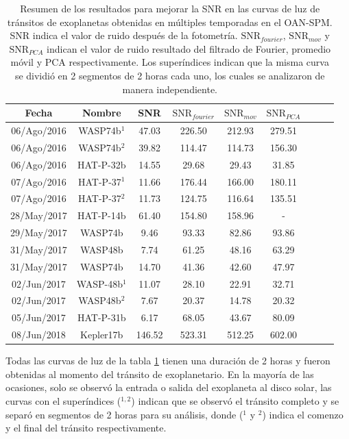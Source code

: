 \begin{table}
	\centering
	\begin{footnotesize}
	\begin{tabular}{ccccccccc}
	\hline 
	Fecha & Nombre & SNR & $\mbox{SNR}_{fourier}$ &  $\mbox{SNR}_{mov}$ & $\mbox{SNR}_{PCA}$\\ 
	\hline
	06/Ago/2016 & WASP74b$^{1}$ & 47.03 & 226.50 & 212.93 & 279.51 \\ 
	06/Ago/2016 & WASP74b$^{2}$ & 39.82 & 114.47 & 114.73 & 156.30 \\
	06/Ago/2016 & HAT-P-32b & 14.55 & 29.68 & 29.43 & 31.85 \\
	07/Ago/2016 & HAT-P-37$^{1}$ & 11.66 & 176.44 & 166.00 & 180.11 \\ 
	07/Ago/2016 & HAT-P-37$^{2}$ & 11.73 & 124.75 & 116.64 & 135.51 \\ 
	28/May/2017 & HAT-P-14b & 61.40 & 154.80 & 158.96 & - \\ 
	29/May/2017 & WASP74b & 9.46 & 93.33 & 82.86 & 93.86 \\
	31/May/2017 & WASP48b & 7.74 & 61.25 & 48.16 & 63.29 \\  
	31/May/2017 & WASP74b & 14.70 & 41.36 & 42.60 & 47.97 \\
	02/Jun/2017 & WASP-48b$^{1}$ & 11.07 & 28.10 & 22.91 & 32.71 \\
	02/Jun/2017 & WASP48b$^{2}$ & 7.67 & 20.37 & 14.78 & 20.32 \\
	05/Jun/2017 & HAT-P-31b & 6.17 & 68.05 & 43.67 & 80.09 \\
	08/Jun/2018 & Kepler17b & 146.52 & 523.31 & 512.25 & 602.00 \\ 
	\hline 
	\end{tabular} 
	\end{footnotesize}
	\caption{Resumen de los resultados para mejorar la SNR en las curvas de luz de tránsitos de exoplanetas obtenidas en múltiples temporadas en el OAN-SPM. SNR indica el valor de ruido después de la fotometría. $\mbox{SNR}_{fourier}$, $\mbox{SNR}_{mov}$ y $\mbox{SNR}_{PCA}$ indican el valor de ruido resultado del filtrado de Fourier, promedio móvil y PCA respectivamente. Los superíndices indican que la misma curva se dividió en 2 segmentos de 2 horas cada uno, los cuales se analizaron de manera independiente.}
	\label{tab_4_1_resultados}
	\end{table}

Todas las curvas de luz de la tabla \ref{tab_4_1_resultados} tienen una duración de 2 horas y fueron obtenidas al momento del tránsito de exoplanetario. En la mayoría de las ocasiones, solo se observó la entrada o salida del exoplaneta al disco solar, las curvas con el superíndices ($^{1,2}$) indican que se observó el tránsito completo y se separó en segmentos de 2 horas para su análisis, donde ($^{1}$ y $^{2}$) indica el comenzo y el final del tránsito respectivamente.

